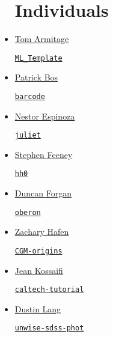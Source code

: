 \documentclass[11pt,a4paper]{article}
\begin{document}
\begin{itemize}
  
\section*{Individuals}  
 
\item \href{https://github.com/TomArmitage}{Tom Armitage}
  \begin{itemize}
    \href{https://github.com/TomArmitage/ML\_Template}{{\tt ML\_Template}}
  \end{itemize}

\item \href{https://github.com/egpbos}{Patrick Bos}
  \begin{itemize}
    \href{https://github.com/egpbos/barcode}{{\tt barcode}}
  \end{itemize}
  
\item \href{https://github.com/nespinoza}{Nestor Espinoza}
  \begin{itemize}
    \href{https://github.com/nespinoza/juliet}{\tt juliet}
  \end{itemize}

\item \href{https://github.com/sfeeney}{Stephen Feeney}
  \begin{itemize}
    \href{https://github.com/sfeeney/hh0}{{\tt hh0}}
  \end{itemize}

\item \href{https://github.com/dh4gan/}{Duncan Forgan}
  \begin{itemize}
    \href{https://github.com/dh4gan/oberon}{\tt oberon}
  \end{itemize}

\item \href{https://github.com/zhafen/}{Zachary Hafen} 
  \begin{itemize}
    \href{https://github.com/zhafen/CGM-origins}{\tt CGM-origins}
  \end{itemize}

\item \href{https://github.com/JeanKossaifi}{Jean Kossaifi}
  \begin{itemize}
    \href{https://github.com/JeanKossaifi/caltech-tutorial}{{\tt caltech-tutorial}}
  \end{itemize}
  
\item \href{https://github.com/dstndstn}{Dustin Lang}
  \begin{itemize}
   \href{https://github.com/dstndstn/unwise-sdss-phot}{\tt unwise-sdss-phot}
   \end{itemize}


\end{itemize}
\end{document}
